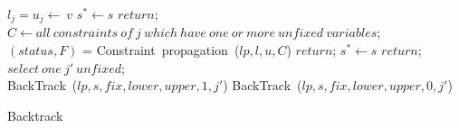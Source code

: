 \documentclass{article}
\begin{document}
\begin{algorithm}[!h]
		${l_j=u_j\leftarrow\ v}$\;
			 {
					 {
						 {
						$s^*\leftarrow s$\;
						$return$;
						}						
					}
			}	
		$C\longleftarrow all\ constraints\ of\ j\ which\ have\ one\ or\ more\ unfixed\ variables$;
		\\ $\left(status,F\right)$ = Constraint\ propagation\ ({$lp,l,u,C$})\;
		 {
				$return$;
		}
		 {
		}
		 {
			 {
					$s^*\leftarrow s$\;
					$return$;
			}						
		}
		$select\ one\ j'\ unfixed$;
		\\ BackTrack\ ({$lp,s,fix,lower,upper,1,j'$})\;
		 BackTrack\ ({$lp,s,fix,lower,upper,0,j'$})\;

    \caption{Backtrack}
      \label{alg:sa}
\end{algorithm}


%
\end{document}
